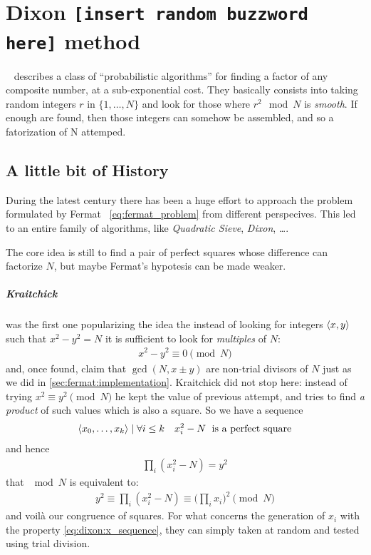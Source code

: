 \chapter{Dixon {\texttt{\small{[insert random buzzword here]}}} method\label{chap:dixon}}

~\cite{dixon} describes a class of ``probabilistic algorithms'' for finding a
factor of any composite number, at a sub-exponential cost. They basically
consists into taking random integers $r$ in $\{1, \ldots, N\}$ and look for those
where $r^2 \mod{N}$ is \emph{smooth}. If enough are found, then those integers
can somehow be assembled, and so a fatorization of N attemped.

\section{A little bit of History \label{sec:dixon:history}}
During the latest century there has been a huge effort to approach the problem
formulated by Fermat ~\ref{eq:fermat_problem} from different perspecives. This
led to an entire family of algorithms, like \emph{Quadratic Sieve},
\emph{Dixon}, \ldots.

The core idea is still to find a pair of perfect squares whose difference can
factorize $N$, but maybe Fermat's hypotesis can be made weaker.

\paragraph{Kraitchick} was the first one popularizing the idea the instead of
looking for integers $\langle x, y\rangle$ such that $x^2 -y^2 = N$ it is sufficient
to look for \emph{multiples} of $N$:
\begin{align}
  x^2 - y^2 \equiv 0 \pmod{N}
\end{align}
and, once found, claim that $\gcd(N, x \pm y)$ are non-trial divisors of $N$
just as we did in \ref{sec:fermat:implementation}.
Kraitchick did not stop here: instead of trying $x^2 \equiv y^2 \pmod{N}$ he
kept the value of previous attempt, and tries to find \emph{a product} of such
values which is also a square. So we have a sequence
\begin{align}
  \label{eq:dixon:x_sequence}
  \langle x_0, \ldots, x_k\rangle \mid \forall i \leq k \quad x_i^2 - N
  \; \text{ is a perfect square}
\end{align}
and hence
\begin{align*}
  \prod_i (x_i^2 - N) = y^2
\end{align*}
that $\mod{N}$ is equivalent to:
\begin{align}
  \label{eq:dixon:fermat_revisited}
  y^2 \equiv \prod_i (x_i^2 - N) \equiv \big( \prod_i x_i \big) ^2 \pmod{N}
\end{align}
and voil\`a our congruence of squares. For what concerns the generation of $x_i$
with the property \ref{eq:dixon:x_sequence}, they can simply taken at random and
tested using trial division.

